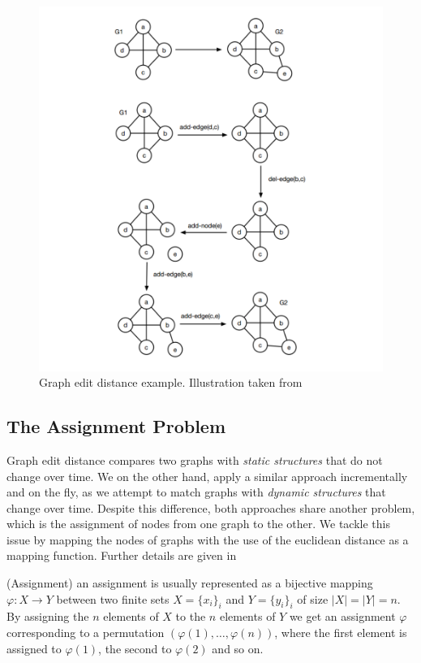 \begin{figure}[t]
	\centering
	\includegraphics[scale=0.5]{./pictures/graph_edit_distance.png}
	\caption{Graph edit distance example. Illustration taken from \cite{graphMatching}}
	\label{graph_edit_distance}
\end{figure}

\subsection{The Assignment Problem} 
Graph edit distance compares two graphs with \textit{static structures} that do not change over time. We on the other hand, apply a similar approach incrementally and on the fly, as we attempt to match graphs with \textit{dynamic structures} that change over time. Despite this difference, both approaches share another problem, which is the assignment of nodes from one graph to the other. We tackle this issue by mapping the nodes of graphs with the use of the euclidean distance as a mapping function. Further details are given in 
%
\theoremstyle{definition}
\begin{definition}{(Assignment)}
	an assignment is usually represented as a bijective mapping $\varphi: X \rightarrow Y$ between two finite sets $X= \{ x_i \}_i$ and $Y= \{ y_i \}_i$ of size $|X| = |Y| = n$. By assigning the $n$ elements of $X$ to the $n$ elements of $Y$ we get an assignment $\varphi$ corresponding to a permutation $(\varphi(1), \dots, \varphi(n))$, where the first element is assigned to $\varphi(1)$, the second to $\varphi(2)$ and so on.
\end{definition}

